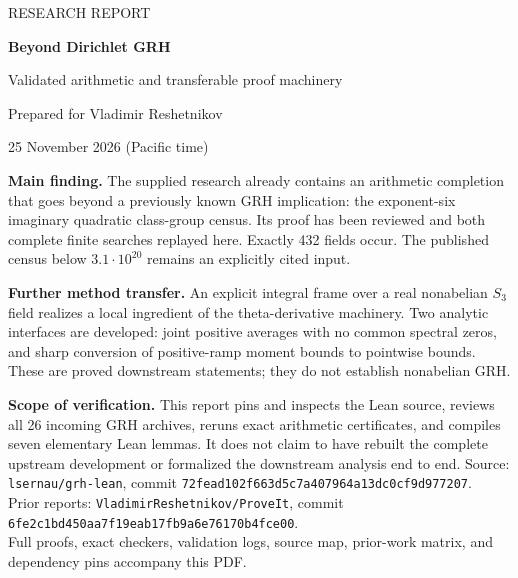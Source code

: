 \documentclass[11pt]{article}
\theoremstyle{remark}
\begin{document}
\begin{titlepage}
\vspace*{1.0cm}
{\small\sffamily\color{accent} RESEARCH REPORT\par}
\vspace{0.6cm}
{\fontsize{29}{35}\selectfont\bfseries\color{ink} Beyond Dirichlet GRH\par}
\vspace{0.35cm}
{\Large Validated arithmetic and transferable proof machinery\par}
\vspace{0.6cm}
{\large Prepared for Vladimir Reshetnikov\par}
{25 November 2026 (Pacific time)\par}
\vspace{0.8cm}
\textbf{Main finding.} The supplied research already contains an arithmetic completion that goes beyond a previously known GRH implication: the exponent-six imaginary quadratic class-group census. Its proof has been reviewed and both complete finite searches replayed here. Exactly 432 fields occur. The published census below $3.1\cdot10^{20}$ remains an explicitly cited input.

\textbf{Further method transfer.} An explicit integral frame over a real nonabelian $S_3$ field realizes a local ingredient of the theta-derivative machinery. Two analytic interfaces are developed: joint positive averages with no common spectral zeros, and sharp conversion of positive-ramp moment bounds to pointwise bounds. These are proved downstream statements; they do not establish nonabelian GRH.

\textbf{Scope of verification.} This report pins and inspects the Lean source, reviews all 26 incoming GRH archives, reruns exact arithmetic certificates, and compiles seven elementary Lean lemmas. It does not claim to have rebuilt the complete upstream development or formalized the downstream analysis end to end.
\vfill
\small
Source: \nolinkurl{lsernau/grh-lean}, commit \texttt{72fead102f663d5c7a407964a13dc0cf9d977207}.\\
Prior reports: \nolinkurl{VladimirReshetnikov/ProveIt}, commit \texttt{6fe2c1bd450aa7f19eab17fb9a6e76170b4fce00}.\\
Full proofs, exact checkers, validation logs, source map, prior-work matrix, and dependency pins accompany this PDF.
\end{titlepage}
\tableofcontents
\newpage








\appendix


\end{document}
